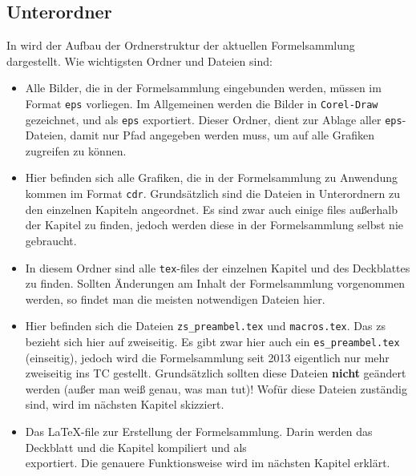 \subsection{Unterordner }
In  wird der Aufbau der Ordnerstruktur der aktuellen
Formelsammlung dargestellt. Wie wichtigsten Ordner und Dateien sind:

\begin{itemize}
  \item {} Alle Bilder, die in der Formelsammlung eingebunden
    werden, müssen im Format {\tt eps} vorliegen. Im Allgemeinen werden die
    Bilder in {\tt Corel-Draw} gezeichnet, und als {\tt eps} exportiert. Dieser
    Ordner, dient zur Ablage aller {\tt eps}-Dateien, damit nur Pfad angegeben
    werden muss, um auf alle Grafiken zugreifen zu können.
  \item {} Hier befinden sich alle Grafiken, die
    in der Formelsammlung zu Anwendung kommen im Format {\tt cdr}. 
    Grundsätzlich sind die Dateien in Unterordnern zu den einzelnen Kapiteln
    angeordnet. Es sind zwar auch einige files außerhalb der Kapitel zu finden,
    jedoch werden diese in der Formelsammlung selbst nie gebraucht.
  \item {} In diesem Ordner sind alle {\tt tex}-files der
    einzelnen Kapitel und des Deckblattes zu finden. Sollten Änderungen
    am Inhalt der Formelsammlung vorgenommen werden, so findet man die meisten
    notwendigen Dateien hier.
  \item {} Hier befinden sich die Dateien {\tt zs\_preambel.tex}
    und {\tt macros.tex}. Das \glqq{}zs\grqq{} bezieht sich hier auf 
    \glqq{}zweiseitig\grqq{}. Es gibt zwar hier auch ein {\tt es\_preambel.tex}
    (\glqq{}einseitig\grqq{}), jedoch wird die Formelsammlung seit 2013 
    eigentlich nur mehr zweiseitig ins TC gestellt. Grundsätzlich sollten diese
    Dateien {\bf nicht} geändert werden (außer man weiß genau, was man tut)!
    Wofür diese Dateien zuständig sind, wird im nächsten Kapitel skizziert.
  \item {} Das \LaTeX-file zur
    Erstellung der Formelsammlung. Darin werden das Deckblatt und die Kapitel
    kompiliert und als \\
    exportiert. Die genauere Funktionsweise wird im nächsten Kapitel erklärt.
\end{itemize}


